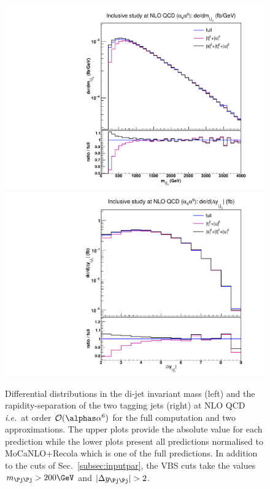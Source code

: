 \begin{figure}[hbt]
\centering
{\includegraphics[scale=0.35]{figures/scanfigures/mjj_nlo.pdf}}
{\includegraphics[scale=0.35]{figures/scanfigures/dyjj_nlo.pdf}}
\caption{
Differential distributions in the di-jet invariant mass (left) and the rapidity-separation of the two tagging jets (right) at NLO QCD \emph{i.e.}\ at order $\mathcal{O}(\alphas\alpha^6)$ for the full computation and two approximations.
The upper plots provide the absolute value for each prediction while the lower plots present all predictions normalised to {\sc MoCaNLO}+{\sc Recola} which is one of the full predictions.
In addition to the cuts of Sec.~\ref{subsec:inputpar}, the VBS cuts take the values $m_{\Pj\Pj}>200 \GeV$ and $|\Delta y_{\Pj\Pj}|>2$.} 
\label{fig:mjjdyjj_1d_1}
\end{figure}

